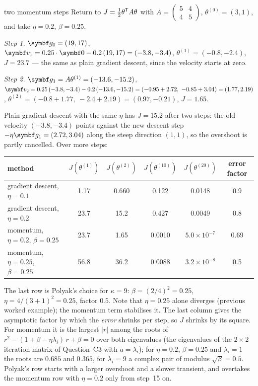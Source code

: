 \documentclass[11pt]{article}
\newcommand{\gvec}{\vect{g}}
\newcommand{\vvec}{\vect{v}}
\begin{document}
\begin{worked}{two momentum steps}
Return to $J = \frac12\theta^{\mathsf{T}} A\theta$ with $A = \begin{pmatrix} 5 & 4 \\ 4 & 5\end{pmatrix}$, $\theta^{(0)} = (3, 1)$, and
take $\eta = 0.2$, $\beta = 0.25$.

\emph{Step 1.} $\gvec_0 = (19, 17)$, $\vvec_1 = 0.25 \cdot \vect{0} - 0.2\,(19, 17) = (-3.8, -3.4)$,
$\theta^{(1)} = (-0.8, -2.4)$, $J = 23.7$ --- the same as plain gradient descent, since the velocity starts at zero.

\emph{Step 2.} $\gvec_1 = A\theta^{(1)} = (-13.6, -15.2)$,
$\vvec_2 = 0.25\,(-3.8, -3.4) - 0.2\,(-13.6, -15.2) = (-0.95 + 2.72,\ -0.85 + 3.04) = (1.77, 2.19)$,
$\theta^{(2)} = (-0.8 + 1.77,\ -2.4 + 2.19) = (0.97, -0.21)$, $J = 1.65$.

Plain gradient descent with the same $\eta$ has $J = 15.2$ after two steps: the old velocity $(-3.8, -3.4)$ points
against the new descent step $-\eta\gvec_1 = (2.72, 3.04)$ along the steep direction $(1, 1)$, so the overshoot is
partly cancelled. Over more steps:
\begin{center}\small
\begin{tabular}{@{}lccccc@{}}
\toprule
method & $J(\theta^{(1)})$ & $J(\theta^{(2)})$ & $J(\theta^{(10)})$ & $J(\theta^{(20)})$ & error factor \\
\midrule
gradient descent, $\eta = 0.1$ & 1.17 & 0.660 & 0.122 & 0.0148 & 0.9 \\
gradient descent, $\eta = 0.2$ & 23.7 & 15.2 & 0.427 & 0.0049 & 0.8 \\
momentum, $\eta = 0.2$, $\beta = 0.25$ & 23.7 & 1.65 & 0.0010 & $5.0 \times 10^{-7}$ & 0.69 \\
momentum, $\eta = 0.25$, $\beta = 0.25$ & 56.8 & 36.2 & 0.0088 & $3.2 \times 10^{-8}$ & 0.5 \\
\bottomrule
\end{tabular}
\end{center}
The last row is Polyak's choice for $\kappa = 9$: $\beta = (2/4)^2 = 0.25$, $\eta = 4/(3 + 1)^2 = 0.25$, factor $0.5$.
Note that $\eta = 0.25$ alone diverges (previous worked example); the momentum term stabilises it. The last column
gives the asymptotic factor by which the \emph{error} shrinks per step, so $J$ shrinks by its square. For momentum it is
the largest $|r|$ among the roots of $r^2 - (1 + \beta - \eta\lambda_i)\,r + \beta = 0$ over both eigenvalues (the
eigenvalues of the $2 \times 2$ iteration matrix of Question~C3 with $a = \lambda_i$); for $\eta = 0.2$, $\beta = 0.25$ and $\lambda_i = 1$ the
roots are $0.685$ and $0.365$, for $\lambda_i = 9$ a complex pair of modulus $\sqrt\beta = 0.5$. Polyak's row starts with
a larger overshoot and a slower transient, and overtakes the momentum row with $\eta = 0.2$ only from step~15 on.
\end{worked}
\end{document}
